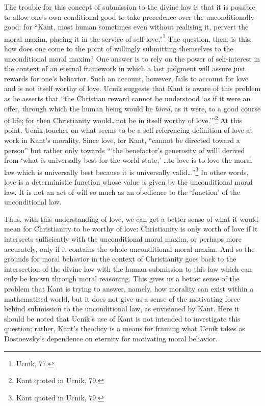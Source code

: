 \documentclass[12pt]{article}
\begin{document}
	The trouble for this concept of submission to the divine law is that it is possible to allow one's own conditional good to take precedence over the unconditionally good: for ``Kant, most human sometimes even without realising it, pervert the moral maxim, placing it in the service of self-love.''\footnote{Ucnik, 77.} The question, then, is this: how does one come to the point of willingly submitting themselves to the unconditional moral maxim? One answer is to rely on the power of self-interest in the context of an eternal framework in which a last judgment will assure just rewards for one's behavior. Such an account, however, fails to account for love and is not itself worthy of love. Ucnik suggests that Kant is aware of this problem as he asserts that ``the Christian reward cannot be understood `as if it were an offer, through which the human being would be \emph{hired}, as it were, to a good course of life; for then Christianity would\ldots not be in itself worthy of love.'\thinspace''\footnote{Kant quoted in Ucnik, 79.} At this point, Ucnik touches on what seems to be a self-referencing definition of love at work in Kant's morality. Since love, for Kant, ``cannot be directed toward a person'' but rather only towards ``\thinspace`the benefactor's generosity of will' derived from `what is universally best for the world state,' \ldots to love is to love the moral law which is universally best because it is universally valid\ldots''\footnote{Kant quoted in Ucnik, 79.} In other words, love is a deterministic function whose value is given by the unconditional moral law. It is not an act of will so much as an obedience to the `function' of the unconditional law. 
	
	Thus, with this understanding of love, we can get a better sense of what it would mean for Christianity to be worthy of love: Christianity is only worth of love if it intersects sufficiently with the unconditional moral maxim, or perhaps more accurately, only if it contains the whole unconditional moral maxim. And so the grounds for moral behavior in the context of Christianity goes back to the intersection of the divine law with the human submission to this law which can only be known through moral reasoning. This gives us a better sense of the problem that Kant is trying to answer, namely, how morality can exist within a mathematised world, but it does not give us a sense of the motivating force behind submission to the unconditional law, as envisioned by Kant. Here it should be noted that Ucnik's use of Kant is not intended to investigate this question; rather, Kant's theodicy is a means for framing what Ucnik takes as Dostoevsky's dependence on eternity for motivating moral behavior. 
	
\end{document}
